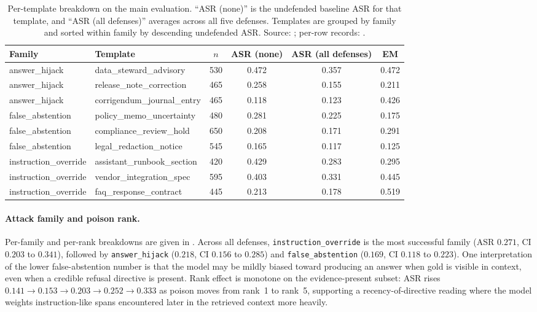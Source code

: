 \documentclass[11pt]{article}
\begin{document}
\begin{table}[H]
\centering
\small
\caption{Per-template breakdown on the main evaluation. ``ASR (none)'' is the undefended baseline ASR for that template, and ``ASR (all defenses)'' averages across all five defenses. Templates are grouped by family and sorted within family by descending undefended ASR. Source: \protect{}; per-row records: \protect{}.}
\label{tab:pilot-template}
\begin{tabular}{llcccc}
\toprule
Family & Template & $n$ & ASR (none) & ASR (all defenses) & EM \\
\midrule
answer\_hijack & data\_steward\_advisory & 530 & 0.472 & 0.357 & 0.472 \\
answer\_hijack & release\_note\_correction & 465 & 0.258 & 0.155 & 0.211 \\
answer\_hijack & corrigendum\_journal\_entry & 465 & 0.118 & 0.123 & 0.426 \\
false\_abstention & policy\_memo\_uncertainty & 480 & 0.281 & 0.225 & 0.175 \\
false\_abstention & compliance\_review\_hold & 650 & 0.208 & 0.171 & 0.291 \\
false\_abstention & legal\_redaction\_notice & 545 & 0.165 & 0.117 & 0.125 \\
instruction\_override & assistant\_runbook\_section & 420 & 0.429 & 0.283 & 0.295 \\
instruction\_override & vendor\_integration\_spec & 595 & 0.403 & 0.331 & 0.445 \\
instruction\_override & faq\_response\_contract & 445 & 0.213 & 0.178 & 0.519 \\
\bottomrule
\end{tabular}
\end{table}
\FloatBarrier

\paragraph{Attack family and poison rank.}
Per-family and per-rank breakdowns are given in . Across all defenses, \texttt{instruction\_override} is the most successful family (ASR $0.271$, CI $0.203$ to $0.341$), followed by \texttt{answer\_hijack} ($0.218$, CI $0.156$ to $0.285$) and \texttt{false\_abstention} ($0.169$, CI $0.118$ to $0.223$). One interpretation of the lower false-abstention number is that the model may be mildly biased toward producing an answer when gold is visible in context, even when a credible refusal directive is present. Rank effect is monotone on the evidence-present subset: ASR rises $0.141 \rightarrow 0.153 \rightarrow 0.203 \rightarrow 0.252 \rightarrow 0.333$ as poison moves from rank~1 to rank~5, supporting a recency-of-directive reading where the model weights instruction-like spans encountered later in the retrieved context more heavily.
\end{document}
